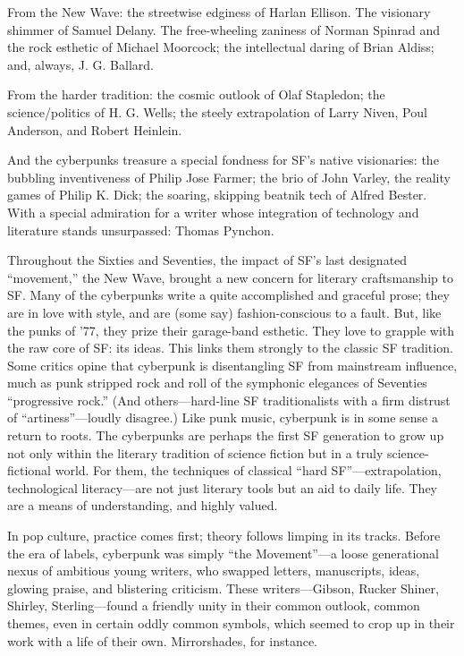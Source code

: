 From the New Wave: the streetwise edginess of Harlan Ellison. The visionary shimmer of Samuel Delany. The free-wheeling zaniness of Norman Spinrad and the rock esthetic of Michael Moorcock; the intellectual daring of Brian Aldiss; and, always, J. G. Ballard.

From the harder tradition: the cosmic outlook of Olaf Stapledon; the science/politics of H. G. Wells; the steely extrapolation of Larry Niven, Poul Anderson, and Robert Heinlein.

And the cyberpunks treasure a special fondness for SF's native visionaries: the bubbling inventiveness of Philip Jose Farmer; the brio of John Varley, the reality games of Philip K. Dick; the soaring, skipping beatnik tech of Alfred Bester. With a special admiration for a writer whose integration of technology and literature stands unsurpassed: Thomas Pynchon.

Throughout the Sixties and Seventies, the impact of SF's last designated ``movement,'' the New Wave, brought a new concern for literary craftsmanship to SF. Many of the cyberpunks write a quite accomplished and graceful prose; they are in love with style, and are (some say) fashion-conscious to a fault. But, like the punks of '77, they prize their garage-band esthetic. They love to grapple with the raw core of SF: its ideas. This links them strongly to the classic SF tradition. Some critics opine that cyberpunk is disentangling SF from mainstream influence, much as punk stripped rock and roll of the symphonic elegances of Seventies ``progressive rock.'' (And others---hard-line SF traditionalists with a firm distrust of ``artiness''---loudly disagree.) Like punk music, cyberpunk is in some sense a return to roots. The cyberpunks are perhaps the first SF generation to grow up not only within the literary tradition of science fiction but in a truly science-fictional world. For them, the techniques of classical ``hard SF''---extrapolation, technological literacy---are not just literary tools but an aid to daily life. They are a means of understanding, and highly valued.

In pop culture, practice comes first; theory follows limping in its tracks. Before the era of labels, cyberpunk was simply ``the Movement''---a loose generational nexus of ambitious young writers, who swapped letters, manuscripts, ideas, glowing praise, and blistering criticism. These writers---Gibson, Rucker Shiner, Shirley, Sterling---found a friendly unity in their common outlook, common themes, even in certain oddly common symbols, which seemed to crop up in their work with a life of their own. Mirrorshades, for instance.

